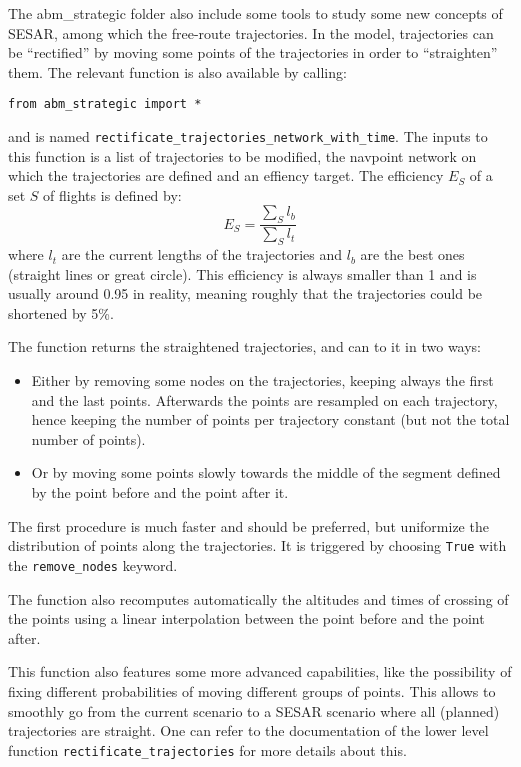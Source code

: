 \documentclass[12pt]{article}
\begin{document}
The abm\_strategic folder also include some tools to study some new concepts of SESAR, among which the free-route trajectories. In the model, trajectories can be ``rectified'' by moving some points of the trajectories in order to ``straighten'' them. The relevant function is also available by calling:
\begin{verbatim}
from abm_strategic import *
\end{verbatim}
and is named \verb|rectificate_trajectories_network_with_time|. The inputs to this function is a list of trajectories to be modified, the navpoint network on which the trajectories are defined and an effiency target. The efficiency $E_S$ of a set $S$ of flights is defined by:
$$
E_S = \frac{\sum_S l_b}{\sum_S l_t}
$$
where $l_t$ are the current lengths of the trajectories and $l_b$ are the best ones (straight lines or great circle). This efficiency is always smaller than 1 and is usually around 0.95 in reality, meaning roughly that the trajectories could be shortened by 5\%.

The function returns the straightened trajectories, and can to it in two ways:
\begin{itemize}
\item Either by removing some nodes on the trajectories, keeping always the first and the last points. Afterwards the points are resampled on each trajectory, hence keeping the number of points per trajectory constant (but not the total number of points).
\item Or by moving some points slowly towards the middle of the segment defined by the point before and the point after it.
\end{itemize}
The first procedure is much faster and should be preferred, but uniformize the distribution of points along the trajectories. It is triggered by choosing \verb|True| with the \verb|remove_nodes| keyword.

The function also recomputes automatically the altitudes and times of crossing of the points using a linear interpolation between the point before and the point after.

This function also features some more advanced capabilities, like the possibility of fixing different probabilities of moving different groups of points. This allows to smoothly go from the current scenario to a SESAR scenario where all (planned) trajectories are straight. One can refer to the documentation of the lower level function  \verb|rectificate_trajectories| for more details about this.
\end{document}

